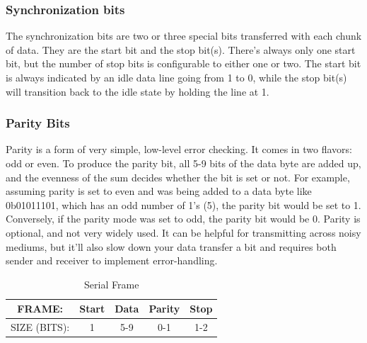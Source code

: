 \subsubsection{Synchronization bits}
The synchronization bits are two or three special bits transferred with each chunk of data.
They are the start bit and the stop bit(s). There’s always only one start bit, but the number of
stop bits is configurable to either one or two. The start bit is always indicated by an idle data
line going from 1 to 0, while the stop bit(s) will transition back to the idle state by holding
the line at 1.
\subsubsection{Parity Bits}
Parity is a form of very simple, low-level error checking. It comes in two flavors: odd or
even. To produce the parity bit, all 5-9 bits of the data byte are added up, and the evenness
of the sum decides whether the bit is set or not. For example, assuming parity is set to even
and was being added to a data byte like 0b01011101, which has an odd number of 1’s (5),
the parity bit would be set to 1. Conversely, if the parity mode was set to odd, the parity bit
would be 0. Parity is optional, and not very widely used. It can be helpful for transmitting
across noisy mediums, but it’ll also slow down your data transfer a bit and requires both
sender and receiver to implement error-handling.\begin{table}[h]
\begin{center}
\begin{tabular}{ |c|c|c|c|c| } 
 \hline
 FRAME:& Start& Data &Parity& Stop\\
\hline 
SIZE (BITS):& 1& 5-9& 0-1& 1-2\\
\hline
\end{tabular}
\caption{Serial Frame}
\end{center}
\end{table}
